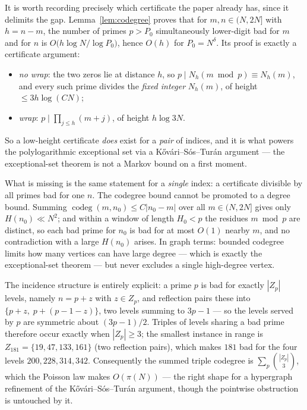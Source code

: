It is worth recording precisely which certificate the paper already has, since it delimits the
gap.  Lemma~\ref{lem:codegree} proves that for $m,n\in(N,2N]$ with $h=n-m$, the number of
primes $p>P_0$ simultaneously lower-digit bad for $m$ and for $n$ is
$O\bigl(h\log N/\log P_0\bigr)$, hence $O(h)$ for $P_0=N^\delta$.  Its proof is exactly a
certificate argument:
\begin{itemize}
\item \emph{no wrap}: the two zeros lie at distance $h$, so $p\mid N_h(m\bmod p)\equiv N_h(m)$,
and every such prime divides the \emph{fixed integer} $N_h(m)$, of height $\le3h\log(CN)$;
\item \emph{wrap}: $p\mid\prod_{j\le h}(m+j)$, of height $h\log 3N$.
\end{itemize}
So a low-height certificate \emph{does} exist for a \emph{pair} of indices, and it is what
powers the polylogarithmic exceptional set via a K\H ov\'ari--S\'os--Tur\'an argument — the
exceptional-set theorem is not a Markov bound on a first moment.

What is missing is the same statement for a \emph{single} index: a certificate divisible by all
primes bad for one $n$.  The codegree bound cannot be promoted to a degree bound.  Summing
$\operatorname{codeg}(m,n_0)\le C|n_0-m|$ over all $m\in(N,2N]$ gives only
$H(n_0)\ll N^2$; and within a window of length $H_0<p$ the residues $m\bmod p$ are distinct, so
each bad prime for $n_0$ is bad for at most $O(1)$ nearby $m$, and no contradiction with a large
$H(n_0)$ arises.  In graph terms: bounded codegree limits how many vertices can have large
degree — which is exactly the exceptional-set theorem — but never excludes a single
high-degree vertex.

The incidence structure is entirely explicit: a prime $p$ is bad for exactly $|Z_p|$ levels,
namely $n=p+z$ with $z\in Z_p$, and reflection pairs these into
$\{p+z,\;p+(p-1-z)\}$, two levels summing to $3p-1$ — so the levels served by $p$ are symmetric
about $(3p-1)/2$.  Triples of levels sharing a bad prime therefore occur exactly when $|Z_p|\ge3$;
the smallest instance in range is $Z_{181}=\{19,47,133,161\}$ (two reflection pairs), which makes
$181$ bad for the four levels $200,228,314,342$.  Consequently the summed triple codegree is
$\sum_p\binom{|Z_p|}3$, which the Poisson law makes $O(\pi(N))$ — the right shape for a
hypergraph refinement of the K\H ov\'ari--S\'os--Tur\'an argument, though the pointwise obstruction
is untouched by it.

